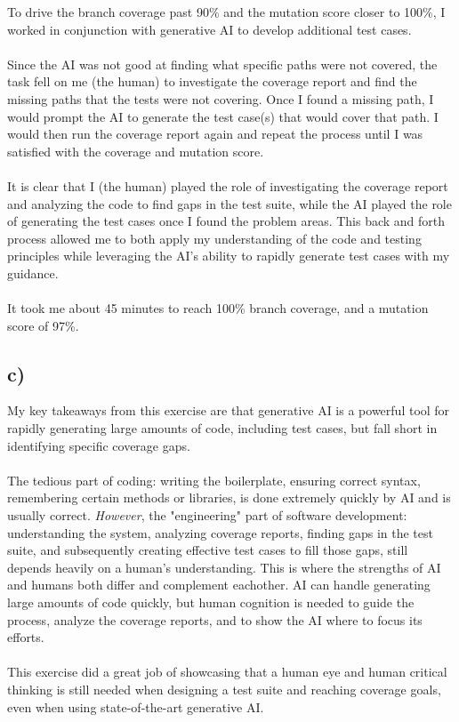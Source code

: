 To drive the branch coverage past 90\% and the mutation score closer to 100\%, I worked in conjunction with generative AI to develop additional test cases.
\\
\\
Since the AI was not good at finding what specific paths were not covered, the task fell on me (the human) to investigate the coverage report and find the missing paths that the tests were not covering. Once I found a missing path, I would prompt the AI to generate the test case(s) that would cover that path. I would then run the coverage report again and repeat the process until I was satisfied with the coverage and mutation score.\\
\\
It is clear that I (the human) played the role of investigating the coverage report and analyzing the code to find gaps in the test suite, while the AI played the role of generating the test cases once I found the problem areas. This back and forth process allowed me to both apply my understanding of the code and testing principles while leveraging the AI's ability to rapidly generate test cases with my guidance.
\\
\\
It took me about 45 minutes to reach 100\% branch coverage, and a mutation score of 97\%.

\subsection{c)}

My key takeaways from this exercise are that generative AI is a powerful tool for rapidly generating large amounts of code, including test cases, but fall short in identifying specific coverage gaps. 
\\
\\
The tedious part of coding: writing the boilerplate, ensuring correct syntax, remembering certain methods or libraries, is done extremely quickly by AI and is usually correct. \emph{However}, the "engineering" part of software development: understanding the system, analyzing coverage reports, finding gaps in the test suite, and subsequently creating effective test cases to fill those gaps, still depends heavily on a human's understanding. This is where the strengths of AI and humans both differ and complement eachother. AI can handle generating large amounts of code quickly, but human cognition is needed to guide the process, analyze the coverage reports, and to show the AI where to focus its efforts.
\\
\\
This exercise did a great job of showcasing that a human eye and human critical thinking is still needed when designing a test suite and reaching coverage goals, even when using state-of-the-art generative AI. 

